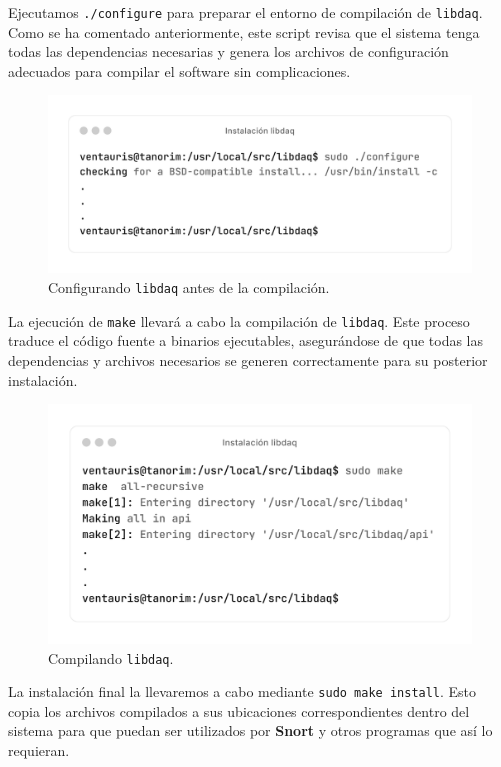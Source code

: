 \documentclass[11pt,a4paper,twoside]{report}
\begin{document}
Ejecutamos \texttt{./configure} para preparar el entorno de compilación de \texttt{libdaq}. Como se ha comentado anteriormente, este script revisa que el sistema tenga todas las dependencias necesarias y genera los archivos de configuración adecuados para compilar el software sin complicaciones.

\begin{figure}[H]
	\centering
	\includegraphics[scale=0.12]{instalacion_snort/11-11.png}
	\caption{Configurando \texttt{libdaq} antes de la compilación.}
\end{figure}

La ejecución de \texttt{make} llevará a cabo la compilación de \texttt{libdaq}. Este proceso traduce el código fuente a binarios ejecutables, asegurándose de que todas las dependencias y archivos necesarios se generen correctamente para su posterior instalación.

\begin{figure}[H]
	\centering
	\includegraphics[scale=0.12]{instalacion_snort/12-12.png}
	\caption{Compilando \texttt{libdaq}.}
\end{figure}

\newpage

La instalación final la llevaremos a cabo mediante \texttt{sudo make install}. Esto copia los archivos compilados a sus ubicaciones correspondientes dentro del sistema para que puedan ser utilizados por \textbf{Snort} y otros programas que así lo requieran.
\end{document}

